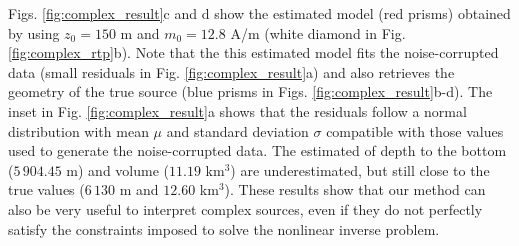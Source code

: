 Figs. \ref{fig:complex_result}c and d show the estimated model (red prisms) 
obtained by using $z_0 = 150$ m and $m_0 = 12.8 $ A/m 
(white diamond in Fig. \ref{fig:complex_rtp}b).
Note that the this estimated model fits the noise-corrupted data 
(small residuals in Fig. \ref{fig:complex_result}a) 
and also retrieves the geometry of the true source 
(blue prisms in Figs. \ref{fig:complex_result}b-d). 
The inset in Fig. \ref{fig:complex_result}a shows that the residuals follow a normal distribution with mean $ \mu $ and standard deviation $ \sigma $ compatible with those values used to generate the noise-corrupted data. 
The estimated of depth to the bottom  ($ 5\,904.45 $ m) and volume ($ 11.19 $ km$^3 $) are underestimated, but still close to the true values ($ 6\,130 $ m and $ 12.60 $ km$^3 $). 
These results show that our method can also be very useful to interpret complex sources, even if they do not perfectly satisfy the constraints imposed to solve the nonlinear inverse problem.